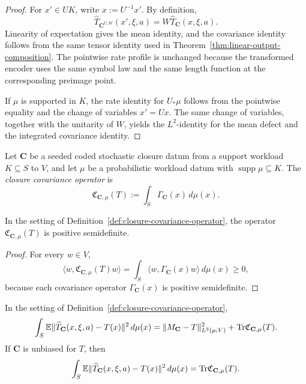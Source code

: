\begin{proof}
For \(x'\in UK\), write \(x:=U^{-1}x'\). By definition,
\[
\widehat T_{\mathbf C^{U,W}}(x',\xi,a)
=
W\widehat T_{\mathbf C}(x,\xi,a).
\]
Linearity of expectation gives the mean identity, and the covariance identity
follows from the same tensor identity used in
Theorem~\ref{thm:linear-output-composition}. The pointwise rate profile is
unchanged because the transformed encoder uses the same symbol law and the same
length function at the corresponding preimage point.

If \(\mu\) is supported in \(K\), the rate identity for \(U_{\ast}\mu\) follows
from the pointwise equality and the change of variables \(x'=Ux\). The same
change of variables, together with the unitarity of \(W\), yields the
\(L^2\)-identity for the mean defect and the integrated covariance identity.
\end{proof}

\begin{definition}
\label{def:closure-covariance-operator}
Let \(\mathbf C\) be a seeded coded stochastic closure datum from a support
workload \(K\subseteq S\) to \(V\), and let \(\mu\) be a probabilistic
workload datum with \(\operatorname{supp}\mu\subseteq K\). The \emph{closure
covariance operator} is
\[
\mathfrak C_{\mathbf C,\mu}(T)
:=
\int_S \Gamma_{\mathbf C}(x)\,d\mu(x).
\]
\end{definition}

\begin{proposition}
\label{prop:closure-covariance-positive}
In the setting of Definition~\ref{def:closure-covariance-operator}, the
operator \(\mathfrak C_{\mathbf C,\mu}(T)\) is positive semidefinite.
\end{proposition}

\begin{proof}
For every \(w\in V\),
\[
\langle w,\mathfrak C_{\mathbf C,\mu}(T)w\rangle
=
\int_S \langle w,\Gamma_{\mathbf C}(x)w\rangle\,d\mu(x)\ge 0,
\]
because each covariance operator \(\Gamma_{\mathbf C}(x)\) is positive
semidefinite.
\end{proof}

\begin{corollary}
\label{cor:integrated-stochastic-closure-error}
In the setting of Definition~\ref{def:closure-covariance-operator},
\[
\int_S \mathbb E\|\widehat T_{\mathbf C}(x,\xi,a)-T(x)\|^2\,d\mu(x)
=
\|M_{\mathbf C}-T\|_{L^2(\mu;V)}^2
+
\mathrm{Tr}\mathfrak C_{\mathbf C,\mu}(T).
\]
If \(\mathbf C\) is unbiased for \(T\), then
\[
\int_S \mathbb E\|\widehat T_{\mathbf C}(x,\xi,a)-T(x)\|^2\,d\mu(x)
=
\mathrm{Tr}\mathfrak C_{\mathbf C,\mu}(T).
\]
\end{corollary}

